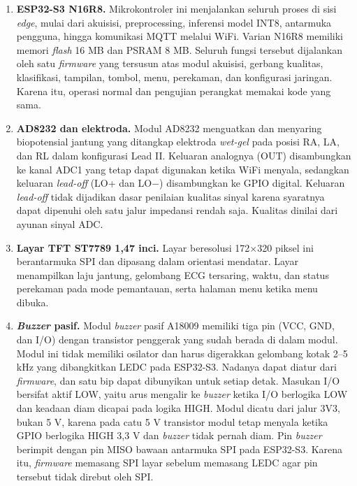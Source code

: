 \begin{enumerate}[label=\alph*.]
  \item \textbf{ESP32-S3 N16R8.} Mikrokontroler ini menjalankan seluruh proses di sisi \textit{edge}, mulai dari akuisisi, preprocessing, inferensi model INT8, antarmuka pengguna, hingga komunikasi MQTT melalui WiFi. Varian N16R8 memiliki memori \textit{flash} 16 MB dan PSRAM 8 MB. Seluruh fungsi tersebut dijalankan oleh satu \textit{firmware} yang tersusun atas modul akuisisi, gerbang kualitas, klasifikasi, tampilan, tombol, menu, perekaman, dan konfigurasi jaringan. Karena itu, operasi normal dan pengujian perangkat memakai kode yang sama.
  \item \textbf{AD8232 dan elektroda.} Modul AD8232 menguatkan dan menyaring biopotensial jantung yang ditangkap elektroda \textit{wet-gel} pada posisi RA, LA, dan RL dalam konfigurasi Lead II. Keluaran analognya (OUT) disambungkan ke kanal ADC1 yang tetap dapat digunakan ketika WiFi menyala, sedangkan keluaran \textit{lead-off} (LO+ dan LO$-$) disambungkan ke GPIO digital. Keluaran \textit{lead-off} tidak dijadikan dasar penilaian kualitas sinyal karena syaratnya dapat dipenuhi oleh satu jalur impedansi rendah saja. Kualitas dinilai dari ayunan sinyal ADC.
  \item \textbf{Layar TFT ST7789 1,47 inci.} Layar beresolusi 172$\times$320 piksel ini berantarmuka SPI dan dipasang dalam orientasi mendatar. Layar menampilkan laju jantung, gelombang ECG tersaring, waktu, dan status perekaman pada mode pemantauan, serta halaman menu ketika menu dibuka.
  \item \textbf{\textit{Buzzer} pasif.} Modul \textit{buzzer} pasif A18009 memiliki tiga pin (VCC, GND, dan I/O) dengan transistor penggerak yang sudah berada di dalam modul. Modul ini tidak memiliki osilator dan harus digerakkan gelombang kotak 2--5 kHz yang dibangkitkan LEDC pada ESP32-S3. Nadanya dapat diatur dari \textit{firmware}, dan satu bip dapat dibunyikan untuk setiap detak. Masukan I/O bersifat aktif LOW, yaitu arus mengalir ke \textit{buzzer} ketika I/O berlogika LOW dan keadaan diam dicapai pada logika HIGH. Modul dicatu dari jalur 3V3, bukan 5 V, karena pada catu 5 V transistor modul tetap menyala ketika GPIO berlogika HIGH 3,3 V dan \textit{buzzer} tidak pernah diam. Pin \textit{buzzer} berimpit dengan pin MISO bawaan antarmuka SPI pada ESP32-S3. Karena itu, \textit{firmware} memasang SPI layar sebelum memasang LEDC agar pin tersebut tidak direbut oleh SPI.

\end{enumerate}
